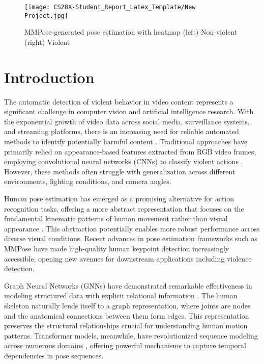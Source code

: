 \documentclass[conference]{IEEEtran}
\begin{document}
\begin{figure*}
    \centering
    \texttt{[image: CS28X-Student\_Report\_Latex\_Template/New Project.jpg]}
    \caption{MMPose-generated pose estimation with heatmap (left) Non-violent (right) Violent}
    \label{fig:enter-label}
\end{figure*}

\section{Introduction}
The automatic detection of violent behavior in video content represents a significant challenge in computer vision and artificial intelligence research. With the exponential growth of video data across social media, surveillance systems, and streaming platforms, there is an increasing need for reliable automated methods to identify potentially harmful content \cite{demarty2014violent}. Traditional approaches have primarily relied on appearance-based features extracted from RGB video frames, employing convolutional neural networks (CNNs) to classify violent actions \cite{sudhakaran2017learning}. However, these methods often struggle with generalization across different environments, lighting conditions, and camera angles.

Human pose estimation has emerged as a promising alternative for action recognition tasks, offering a more abstract representation that focuses on the fundamental kinematic patterns of human movement rather than visual appearance \cite{liu2020disentangling}. This abstraction potentially enables more robust performance across diverse visual conditions. Recent advances in pose estimation frameworks such as MMPose \cite{mmpose2020} have made high-quality human keypoint detection increasingly accessible, opening new avenues for downstream applications including violence detection.

Graph Neural Networks (GNNs) have demonstrated remarkable effectiveness in modeling structured data with explicit relational information \cite{kipf2017semi, velivckovic2018graph}. The human skeleton naturally lends itself to a graph representation, where joints are nodes and the anatomical connections between them form edges. This representation preserves the structural relationships crucial for understanding human motion patterns. Transformer models, meanwhile, have revolutionized sequence modeling across numerous domains \cite{vaswani2017attention}, offering powerful mechanisms to capture temporal dependencies in pose sequences.
\end{document}
